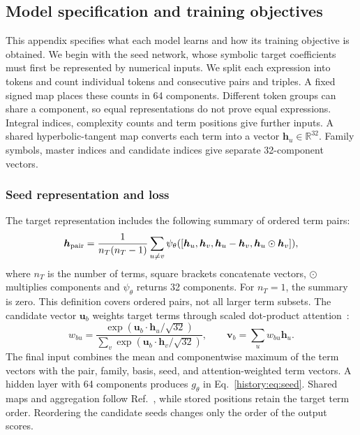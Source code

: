\subsection{Model specification and training objectives}
\label{history:app:models}
This appendix specifies what each model learns and how its training objective is obtained. We begin with the seed network, whose symbolic target coefficients must first be represented by numerical inputs. We split each expression into tokens and count individual tokens and consecutive pairs and triples. A fixed signed map places these counts in 64 components. Different token groups can share a component, so equal representations do not prove equal expressions. Integral indices, complexity counts and term positions give further inputs. A shared hyperbolic-tangent map converts each term into a vector $\boldsymbol h_u\in\mathbb R^{32}$. Family symbols, master indices and candidate indices give separate 32-component vectors.

\subsubsection{Seed representation and loss}
The target representation includes the following summary of ordered term pairs:
\begin{equation}
 \boldsymbol h_{\rm pair}=
 \frac{1}{n_T(n_T-1)}\sum_{u\ne v}
 \psi_\theta([\boldsymbol h_u,\boldsymbol h_v,
       \boldsymbol h_u-\boldsymbol h_v,
       \boldsymbol h_u\odot\boldsymbol h_v]),
 \label{history:eq:pair}
\end{equation}
where $n_T$ is the number of terms, square brackets concatenate vectors, $\odot$ multiplies components and $\psi_\theta$ returns 32 components. For $n_T=1$, the summary is zero. This definition covers ordered pairs, not all larger term subsets. The candidate vector $\boldsymbol u_b$ weights target terms through scaled dot-product attention~\cite{AttentionIsAllYouNeed}:
\begin{equation}
 w_{bu}=\frac{\exp(\boldsymbol u_b\cdot\boldsymbol h_u/\sqrt{32})}
 {\sum_v\exp(\boldsymbol u_b\cdot\boldsymbol h_v/\sqrt{32})},
 \qquad \boldsymbol v_b=\sum_u w_{bu}\boldsymbol h_u.
\end{equation}
The final input combines the mean and componentwise maximum of the term vectors with the pair, family, basis, seed, and attention-weighted term vectors. A hidden layer with 64 components produces $g_\theta$ in Eq.~\eqref{history:eq:seed}. Shared maps and aggregation follow Ref.~\cite{DeepSets}, while stored positions retain the target term order. Reordering the candidate seeds changes only the order of the output scores.

